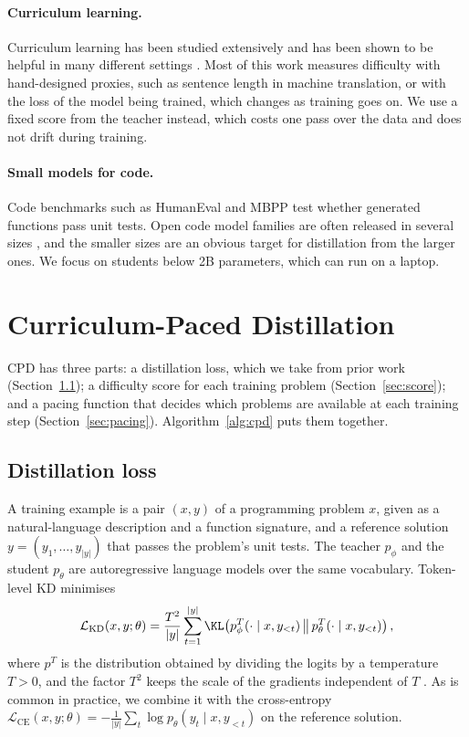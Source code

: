 \documentclass{article} %
\begin{document}
\paragraph{Curriculum learning.}
Curriculum learning has been studied extensively and has been shown to be helpful in many different settings \citep{bengio2009curriculum}.
Most of this work measures difficulty with hand-designed proxies, such as sentence length in machine translation, or with the loss of the model being trained, which changes as training goes on.
We use a fixed score from the teacher instead, which costs one pass over the data and does not drift during training.

\paragraph{Small models for code.}
Code benchmarks such as HumanEval \citep{chen2021evaluating} and MBPP \citep{austin2021program} test whether generated functions pass unit tests.
Open code model families are often released in several sizes \citep{roziere2023code}, and the smaller sizes are an obvious target for distillation from the larger ones.
We focus on students below 2B parameters, which can run on a laptop.

\section{Curriculum-Paced Distillation}
\label{sec:method}

CPD has three parts: a distillation loss, which we take from prior work (Section~\ref{sec:loss}); a difficulty score for each training problem (Section~\ref{sec:score}); and a pacing function that decides which problems are available at each training step (Section~\ref{sec:pacing}).
Algorithm~\ref{alg:cpd} puts them together.

\subsection{Distillation loss}
\label{sec:loss}

A training example is a pair $(x, y)$ of a programming problem $x$, given as a natural-language description and a function signature, and a reference solution $y = (y_1, \dots, y_{|y|})$ that passes the problem's unit tests.
The teacher $p_\phi$ and the student $p_\theta$ are autoregressive language models over the same vocabulary.
Token-level KD minimises
\begin{equation}
\mathcal{L}_{\mathrm{KD}}(x, y; \theta) = \frac{T^2}{|y|} \sum_{t=1}^{|y|} \KL\!\left( p_\phi^{T}(\cdot \mid x, y_{<t}) \,\big\|\, p_\theta^{T}(\cdot \mid x, y_{<t}) \right),
\label{eq:kd}
\end{equation}
where $p^{T}$ is the distribution obtained by dividing the logits by a temperature $T > 0$, and the factor $T^2$ keeps the scale of the gradients independent of $T$ \citep{hinton2015distilling}.
As is common in practice, we combine it with the cross-entropy $\mathcal{L}_{\mathrm{CE}}(x, y; \theta) = -\frac{1}{|y|} \sum_{t} \log p_\theta(y_t \mid x, y_{<t})$ on the reference solution.
\end{document}

